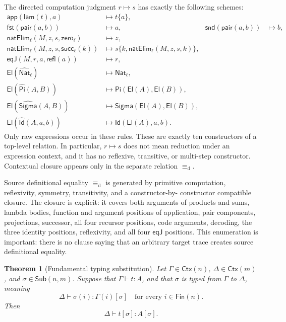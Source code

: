 \documentclass[10pt,reqno]{amsart}
\newtheorem{theorem}{Theorem}[section]
\newcommand{\Fin}{\mathsf{Fin}}
\newcommand{\Ctx}{\mathsf{Ctx}}
\newcommand{\Sub}{\mathsf{Sub}}
\newcommand{\PiTy}{\mathsf{Pi}}
\newcommand{\SigmaTy}{\mathsf{Sigma}}
\newcommand{\Lam}{\mathsf{lam}}
\newcommand{\App}{\mathsf{app}}
\newcommand{\Pair}{\mathsf{pair}}
\newcommand{\Fst}{\mathsf{fst}}
\newcommand{\Snd}{\mathsf{snd}}
\newcommand{\NatTy}{\mathsf{Nat}}
\newcommand{\Zero}{\mathsf{zero}}
\newcommand{\Succ}{\mathsf{succ}}
\newcommand{\NatElim}{\mathsf{natElim}}
\newcommand{\CodeNat}{\widehat{\mathsf{Nat}}}
\newcommand{\CodePi}{\widehat{\mathsf{Pi}}}
\newcommand{\CodeSigma}{\widehat{\mathsf{Sigma}}}
\newcommand{\CodeId}{\widehat{\mathsf{Id}}}
\newcommand{\El}{\mathsf{El}}
\newcommand{\IdTy}{\mathsf{Id}}
\newcommand{\Refl}{\mathsf{refl}}
\newcommand{\EqJ}{\mathsf{eqJ}}
\newcommand{\defeq}{\mathrel{\equiv_{\mathrm d}}}
\newcommand{\red}{\mathrel{\longmapsto}}
\begin{document}
The directed computation judgment \(r\red s\) has exactly the following
schemes:
\begin{equation}
\begin{aligned}
\App(\Lam(t),a)&\red t\{a\},\\
\Fst(\Pair(a,b))&\red a,
&
\Snd(\Pair(a,b))&\red b,\\
\NatElim_\ell(M,z,s,\Zero_\ell)&\red z,\\
\NatElim_\ell(M,z,s,\Succ_\ell(k))
 &\red s\{k,\NatElim_\ell(M,z,s,k)\},\\
\EqJ(M,r,a,\Refl(a))&\red r,\\
\El(\CodeNat_\ell)&\red\NatTy_\ell,\\
\El(\CodePi(A,B))&\red\PiTy(\El(A),\El(B)),\\
\El(\CodeSigma(A,B))&\red\SigmaTy(\El(A),\El(B)),\\
\El(\CodeId(A,a,b))&\red\IdTy(\El(A),a,b).
\end{aligned}
\tag{5.2}\label{eq:computations}
\end{equation}
Only raw expressions occur in these rules.  These are exactly ten
constructors of a top-level relation.  In particular, \(r\red s\) does not
mean reduction under an expression context, and it has no reflexive,
transitive, or multi-step constructor.  Contextual closure appears only in
the separate relation \(\defeq\).

Source definitional equality \(\defeq\) is generated by primitive
computation, reflexivity, symmetry, transitivity, and a constructor-by-
constructor compatible closure.  The closure is explicit: it covers both
arguments of products and sums, lambda bodies, function and argument
positions of application, pair components, projections, successor, all four
recursor positions, code arguments, decoding, the three identity positions,
reflexivity, and all four \(\EqJ\) positions.  This enumeration is important:
there is no clause saying that an arbitrary target trace creates source
definitional equality.

\begin{theorem}[Fundamental typing substitution]
\label{thm:fundamental-substitution}
Let \(\Gamma\in\Ctx(n)\), \(\Delta\in\Ctx(m)\), and
\(\sigma\in\Sub(n,m)\).  Suppose that \(\Gamma\vdash t:A\), and that
\(\sigma\) is typed from \(\Gamma\) to \(\Delta\), meaning
\[
      \Delta\vdash\sigma(i):\Gamma(i)[\sigma]
                 \quad\text{for every }i\in\Fin(n).
\tag{5.3}\label{eq:typed-substitution}
\]
Then
\[
                   \Delta\vdash t[\sigma]:A[\sigma].
\]
\end{theorem}
\end{document}
